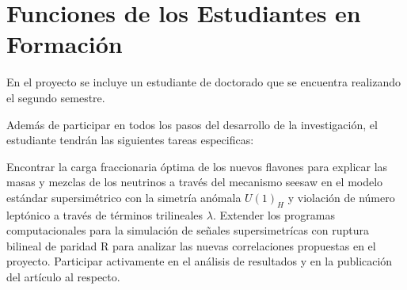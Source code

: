 \section{ Funciones de los Estudiantes en Formación }



En el proyecto se incluye un estudiante de doctorado que se encuentra realizando
el segundo semestre.

Además de participar en todos los pasos del desarrollo de la
investigación, el estudiante  tendrán las siguientes
tareas especificas:

 Encontrar la carga fraccionaria óptima de los nuevos flavones para explicar las masas y mezclas de los neutrinos a través del mecanismo seesaw en el modelo estándar supersimétrico con la simetría anómala $U(1)_H$ y violación de número leptónico a través de términos trilineales $\lambda$.
 Extender los programas computacionales para la simulación de señales supersimetrícas con ruptura bilineal de paridad R para analizar las nuevas correlaciones propuestas en el proyecto.
 Participar activamente en el análisis de resultados y en la
  publicación del artículo al respecto.


